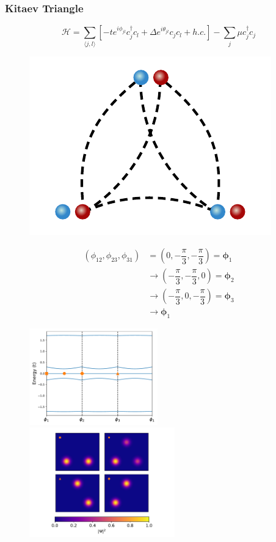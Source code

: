 \documentclass[xcolor=dvipsnames,10pt,aspectratio=169]{beamer}
\newcommand{\ham}{\mathcal{H}}
\newcommand{\cc}{c^{\dagger}}
\newcommand{\de}{\Delta}
\begin{document}
  \begin{frame}
    \frametitle{Kitaev Triangle}


    \begin{multicols}{2}
      \footnotesize
      \begin{equation*}
        \ham = \sum_{\langle j,l\rangle} \left[ -t e^{i\phi_{jl}}\cc_{j} c_l + \de e^{i\theta_{jl}} c_{j}c_l + h.c.\right] - \sum_j \mu \cc_j c_j
      \end{equation*}

      \vspace{-05mm}
      \begin{figure}
        \includegraphics[width=.3\textwidth]{./figures/3-point-triangle.pdf}
      \end{figure}

      \vspace{-05mm}
      \footnotesize
      \begin{align*}
        (\phi_{12},\phi_{23},\phi_{31}) &= \left(0, -\dfrac{\pi}{3}, -\dfrac{\pi}{3}\right) = \bm\phi_1 \\
        &\rightarrow \left( -\dfrac{\pi}{3}, -\dfrac{\pi}{3}, 0 \right) = \bm\phi_2 \\
        &\rightarrow \left( -\dfrac{\pi}{3}, 0, -\dfrac{\pi}{3} \right) = \bm\phi_3 \\
        &\rightarrow \bm\phi_1
      \end{align*}

      \pause
      \begin{figure}
        \includegraphics[width=15em]{./figures/3eigval.pdf} \\
        \hspace{3mm}
        \includegraphics[width=17em]{./figures/3eigvec.pdf}
      \end{figure}

    \end{multicols}

  \end{frame}
\end{document}
